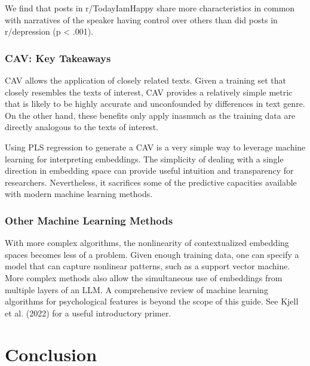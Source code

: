 \documentclass[
  man,
  floatsintext,
  longtable,
  nolmodern,
  notxfonts,
  notimes,
  colorlinks=true,linkcolor=blue,citecolor=blue,urlcolor=blue]{apa7}
\begin{document}
We find that posts in r/TodayIamHappy share more characteristics in
common with narratives of the speaker having control over others than
did posts in r/depression (p \textless{} .001).

\subsubsection{CAV: Key Takeaways}\label{cav-key-takeaways}

CAV allows the application of closely related texts. Given a training
set that closely resembles the texts of interest, CAV provides a
relatively simple metric that is likely to be highly accurate and
unconfounded by differences in text genre. On the other hand, these
benefits only apply inasmuch as the training data are directly analogous
to the texts of interest.

Using PLS regression to generate a CAV is a very simple way to leverage
machine learning for interpreting embeddings. The simplicity of dealing
with a single direction in embedding space can provide useful intuition
and transparency for researchers. Nevertheless, it sacrifices some of
the predictive capacities available with modern machine learning
methods.

\subsubsection{Other Machine Learning
Methods}\label{other-machine-learning-methods}

With more complex algorithms, the nonlinearity of contextualized
embedding spaces becomes less of a problem. Given enough training data,
one can specify a model that can capture nonlinear patterns, such as a
support vector machine. More complex methods also allow the simultaneous
use of embeddings from multiple layers of an LLM. A comprehensive review
of machine learning algorithms for psychological features is beyond the
scope of this guide. See Kjell et al. (2022) for a useful introductory
primer.

\section{Conclusion}\label{conclusion}
\end{document}
